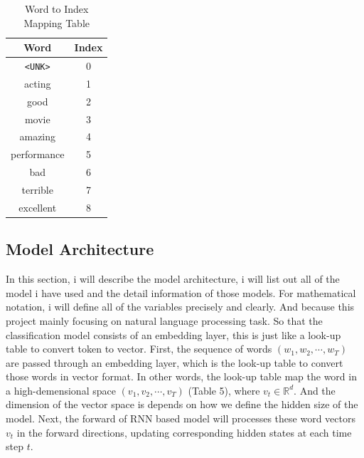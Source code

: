 \documentclass[12pt,a4paper]{article}
\begin{document}
\begin{enumerate}
\begin{table}[h!]
    \centering
    \begin{tabular}{|c|c|}
        \hline
        \textbf{Word} & \textbf{Index} \\ \hline
        \texttt{<UNK>} & 0 \\ \hline
        acting & 1 \\ \hline
        good & 2 \\ \hline
        movie & 3 \\ \hline
        amazing & 4 \\ \hline
        performance & 5 \\ \hline
        bad & 6 \\ \hline
        terrible & 7 \\ \hline
        excellent & 8 \\ \hline
    \end{tabular}
    \caption{Word to Index Mapping Table}
    \label{tab:word_index}
\end{table}
\end{enumerate}
\subsection{Model Architecture}
In this section, i will describe the model architecture, i will list out all of the model i have used and the detail information of those models. For mathematical notation, i will define all of the variables precisely and clearly. And because this project mainly focusing on natural language processing task. So that the classification model consists of an embedding layer, this is just like a look-up table to convert token to vector. First, the sequence of words $(w_1, w_2, \cdots, w_T)$ are passed through an embedding layer, which is the look-up table to convert those words in vector format. In other words, the look-up table map the word in a high-demensional space $(v_1, v_2, \cdots, v_T)$ (Table 5), where $v_t \in \mathbb{R}^d$. And the dimension of the vector space is depends on how we define the hidden size of the model. Next, the forward of RNN based model will processes these word vectors $v_t$ in the forward directions, updating corresponding hidden states at each time step $t$. 
\end{document}
